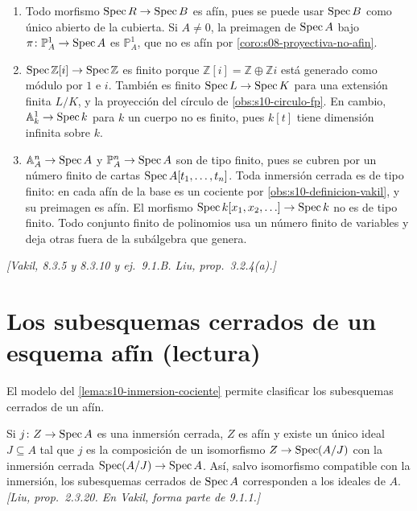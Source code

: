 \begin{ejem}
\label{ejem:s10-ejemplos-finitud}
\begin{enumerate}[label=(\alph*)]
\item Todo morfismo \(\operatorname{Spec} R\to\operatorname{Spec} B\) es afín, pues se puede usar \(\operatorname{Spec} B\) como único abierto de la cubierta. Si \(A\ne0\), la preimagen de \(\operatorname{Spec} A\) bajo \(\pi\colon\mathbb P^1_A\to\operatorname{Spec} A\) es \(\mathbb P^1_A\), que no es afín por \cref{coro:s08-proyectiva-no-afin}.
\item \(\operatorname{Spec}\mathbb Z[i]\to\operatorname{Spec}\mathbb Z\) es finito porque \(\mathbb Z[i]=\mathbb Z\oplus\mathbb Zi\) está generado como módulo por \(1\) e \(i\). También es finito \(\operatorname{Spec} L\to\operatorname{Spec} K\) para una extensión finita \(L/K\), y la proyección del círculo de \cref{obs:s10-circulo-fp}. En cambio, \(\mathbb A^1_k\to\operatorname{Spec} k\) para \(k\) un cuerpo no es finito, pues \(k[t]\) tiene dimensión infinita sobre \(k\).
\item \(\mathbb A^n_A\to\operatorname{Spec} A\) y \(\mathbb P^n_A\to\operatorname{Spec} A\) son de tipo finito, pues se cubren por un número finito de cartas \(\operatorname{Spec} A[t_1,\ldots,t_n]\). Toda inmersión cerrada es de tipo finito: en cada afín de la base es un cociente por \cref{obs:s10-definicion-vakil}, y su preimagen es afín. El morfismo \(\operatorname{Spec} k[x_1,x_2,\ldots]\to\operatorname{Spec} k\) no es de tipo finito. Todo conjunto finito de polinomios usa un número finito de variables y deja otras fuera de la subálgebra que genera.
\end{enumerate}
\emph{[Vakil, 8.3.5 y 8.3.10 y ej.~9.1.B. Liu, prop.~3.2.4(a).]}
\end{ejem}

\section{Los subesquemas cerrados de un esquema afín (lectura)}
\label{sec:s10-cerrados-afines}

El modelo del \cref{lema:s10-inmersion-cociente} permite clasificar los subesquemas cerrados de un afín.

\begin{teo}
\label{teo:s10-clasificacion-cerrados}
Si \(j\colon Z\to\operatorname{Spec} A\) es una inmersión cerrada, \(Z\) es afín y existe un único ideal \(J\subseteq A\) tal que \(j\) es la composición de un isomorfismo \(Z\to\operatorname{Spec}(A/J)\) con la inmersión cerrada \(\operatorname{Spec}(A/J)\to\operatorname{Spec} A\). Así, salvo isomorfismo compatible con la inmersión, los subesquemas cerrados de \(\operatorname{Spec} A\) corresponden a los ideales de \(A\). \emph{[Liu, prop.~2.3.20. En Vakil, forma parte de 9.1.1.]}
\end{teo}

